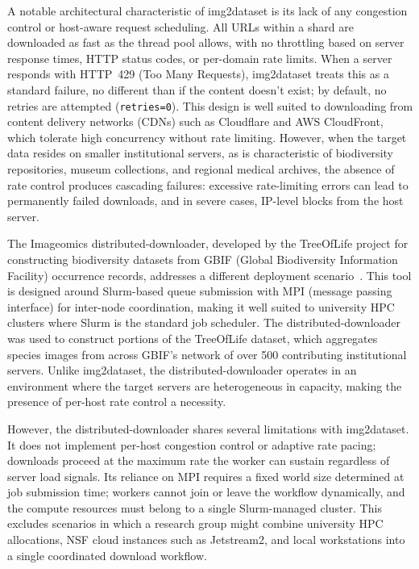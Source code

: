 \documentclass[11pt, letterpaper]{article}
\begin{document}
A notable architectural characteristic of img2dataset is its lack of any
congestion control or host-aware request scheduling. All URLs within a shard are
downloaded as fast as the thread pool allows, with no throttling based on server
response times, HTTP status codes, or per-domain rate limits. When a server responds with HTTP~429
(Too Many Requests), img2dataset treats this as a standard failure, no different than if the content doesn't exist; by
default, no retries are attempted (\texttt{retries=0}). This design is well
suited to downloading from content delivery networks (CDNs) such as Cloudflare and AWS
CloudFront, which tolerate high concurrency without rate limiting. However, when
the target data resides on smaller institutional servers, as is characteristic
of biodiversity repositories, museum collections, and regional medical
archives, the absence of rate control produces cascading failures: excessive
rate-limiting errors can lead to permanently failed downloads, and in severe cases,
IP-level blocks from the host server.

The Imageomics distributed-downloader, developed by the TreeOfLife project for
constructing biodiversity datasets from GBIF (Global Biodiversity Information
Facility) occurrence records, addresses a different deployment
scenario~\cite{yang2024biotrove}. This tool is designed around Slurm-based
queue submission with MPI (message passing interface) for inter-node coordination, making it well suited to
university HPC clusters where Slurm is the standard job scheduler. The
distributed-downloader was used to construct portions of the TreeOfLife dataset,
which aggregates species images from across GBIF's network of over 500
contributing institutional servers. Unlike img2dataset,
the distributed-downloader operates in an environment where the target servers
are heterogeneous in capacity, making the presence of per-host rate
control a necessity.

However, the distributed-downloader shares several limitations with img2dataset.
It does not implement per-host congestion control or adaptive rate pacing;
downloads proceed at the maximum rate the worker can sustain regardless of
server load signals. Its reliance on MPI requires a fixed world size determined
at job submission time; workers cannot join or leave the workflow dynamically,
and the compute resources must belong to a single Slurm-managed cluster. This
excludes scenarios in which a research group might combine university HPC
allocations, NSF cloud instances such as Jetstream2, and local workstations into
a single coordinated download workflow.
\end{document}
